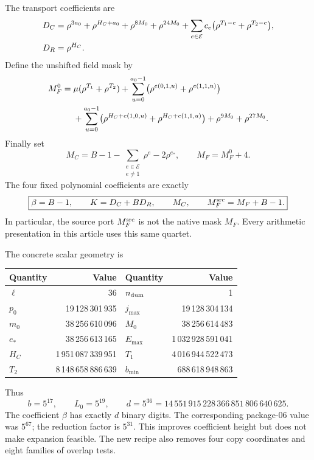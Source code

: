 The transport coefficients are
\begin{align}
 D_C={}&\rho^{3a_0}+\rho^{H_C+a_0}
       +\rho^{8M_0}+\rho^{24M_0}
       +\sum_{e\in\mathcal E}c_e
              \bigl(\rho^{T_1-e}+\rho^{T_2-e}\bigr),\notag\\
 D_R={}&\rho^{H_C}.
 \label{eq:cross-transport-constants}
\end{align}
Define the unshifted field mask by
\begin{align}
 M_F^0={}&\mu(\rho^{T_1}+\rho^{T_2})
       +\sum_{u=0}^{a_0-1}
            \bigl(\rho^{e(0,1,u)}+\rho^{e(1,1,u)}\bigr)\notag\\
 &+\sum_{u=0}^{a_0-1}
            \bigl(\rho^{H_C+e(1,0,u)}+\rho^{H_C+e(1,1,u)}\bigr)
       +\rho^{9M_0}+\rho^{27M_0}.
 \label{eq:cross-field-mask}
\end{align}
Finally set
\begin{equation}\label{eq:cross-word-mask}
 M_C=B-1-\sum_{\substack{e\in\mathcal E\\e\ne1}}\rho^e
                  -2\rho^{e_*},
 \qquad M_F=M_F^0+4.
\end{equation}
The four fixed polynomial coefficients are exactly
\begin{equation}\boxed{
 \beta=B-1,\qquad K=D_C+BD_R,\qquad M_C,\qquad
 M_F^{\mathrm{src}}=M_F+B-1.}\label{eq:new-four-ports}
\end{equation}
In particular, the source port \(M_F^{\mathrm{src}}\) is not the native mask \(M_F\).
Every arithmetic presentation in this article uses this same quartet.

The concrete scalar geometry is
\begin{center}\small
\begin{tabular}{@{}lr@{\qquad}lr@{}}
\toprule
Quantity&Value&Quantity&Value\\
\midrule
\(\ell\)&36&\(n_{\rm dum}\)&1\\
\(p_0\)&19\,128\,301\,935&\(j_{\max}\)&19\,128\,304\,134\\
\(m_0\)&38\,256\,610\,096&\(M_0\)&38\,256\,614\,483\\
\(e_*\)&38\,256\,613\,165&\(E_{\max}\)&1\,032\,928\,591\,041\\
\(H_C\)&1\,951\,087\,339\,951&\(T_1\)&4\,016\,944\,522\,473\\
\(T_2\)&8\,148\,658\,886\,639&\(b_{\min}\)&688\,618\,948\,863\\
\bottomrule
\end{tabular}
\end{center}
Thus
\begin{equation}\label{eq:smaller-d}
 b=5^{17},\qquad L_0=5^{19},\qquad
 d=5^{36}=14\,551\,915\,228\,366\,851\,806\,640\,625.
\end{equation}
The coefficient \(\beta\) has exactly \(d\) binary digits.
The corresponding package-06 value was \(5^{67}\); the reduction
factor is \(5^{31}\). This improves coefficient height but does not
make expansion feasible. The new recipe also removes four copy
coordinates and eight families of overlap tests.

